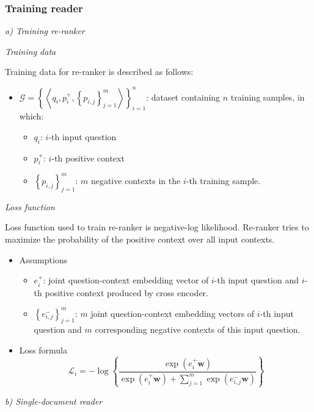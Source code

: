 \documentclass[12pt, sort&compress]{report}
\begin{document}
\subsubsection{Training reader}
\label{sec:3.2.2.2}
\par \textit{a) Training re-ranker}
\par \textit{Training data}
\par Training data for re-ranker is described as follows:
\begin{itemize}
	\item 
	$\mathcal{G} = \left\{\left\langle q_i, p_i^+, \left\{p_{i, j}\right\}_{j=1}^m\right\rangle\right\}_{i=1}^n$: dataset containing $n$ training samples, in which:
	\begin{itemize}
		\item $q_i$: $i$-th input question
		\item $p_i^+$: $i$-th positive context
		\item $\left\{p_{i,j}\right\}_{j=1}^m$: $m$ negative contexts in the $i$-th training sample.
	\end{itemize}
\end{itemize}
\par \textit{Loss function}
\par Loss function used to train re-ranker is negative-log likelihood. Re-ranker tries to maximize the probability of the positive context over all input contexts. 
\begin{itemize}
	\item Assumptions
	\begin{itemize}
		\item $e_i^+$: joint question-context embedding vector of $i$-th input question and $i$-th positive context produced by cross encoder.
		\item $\left\{e_{i, j}^-\right\}_{j=1}^m$: $m$ joint question-context embedding vectors of $i$-th input question and $m$ corresponding negative contexts of this input question. 
	\end{itemize}
	\item Loss formula \\[10pt]
	\begin{equation}
		\label{eq:04}
		\mathcal{L}_i =-\log\left\{ \dfrac{\exp\left(e^+_i\mathbf{w}\right)}{\exp\left(e^+_i\mathbf{w}\right) + \sum\limits_{j=1}^m\exp\left(e^-_{i,j}\mathbf{w}\right)}\right\}
	\end{equation}
\end{itemize}
\par \textit{b) Single-document reader}
\end{document}
